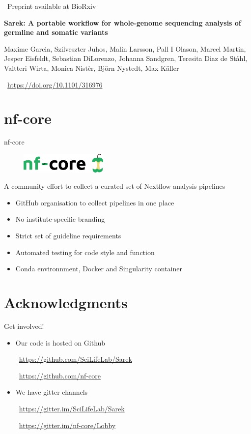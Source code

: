 \documentclass[usepdftitle=false]{beamer}
\begin{document}
\begin{frame}{\faWrench\ Preprint available at BioRxiv}

	\textbf{Sarek: A portable workflow for whole-genome sequencing analysis of germline and somatic variants}

	\small{Maxime Garcia,
	Szilveszter Juhos,
	Malin Larsson,
	Pall I Olason,
	Marcel Martin,
	Jesper Eisfeldt,
	Sebastian DiLorenzo,
	Johanna Sandgren,
	Teresita Diaz de Ståhl,
	Valtteri Wirta,
	Monica Nistèr,
	Björn Nystedt,
	Max Käller}

	\aiDoi\ \url{https://doi.org/10.1101/316976}
\end{frame}

\section{nf-core}

\begin{frame}{nf-core}
	\begin{figure}
		\includegraphics[height=1cm]{pictures/nf-core}
	\end{figure}
	A community effort to collect a curated set of Nextflow analysis pipelines
	\begin{itemize}
		\item GitHub organisation to collect pipelines in one place
		\item No institute-specific branding
		\item Strict set of guideline requirements
		\item Automated testing for code style and function
		\item Conda environnment, Docker and Singularity container
	\end{itemize}
\end{frame}

\section{Acknowledgments}

\begin{frame}{Get involved!}
	\begin{itemize}
		\item Our code is hosted on Github

		\faGithub\ \url{https://github.com/SciLifeLab/Sarek}

		\faGithub\ \url{https://github.com/nf-core}
	\end{itemize}
	\pause
	\begin{itemize}
		\item We have gitter channels

		\faGroup\ \url{https://gitter.im/SciLifeLab/Sarek}

		\faGroup\ \url{https://gitter.im/nf-core/Lobby}
	\end{itemize}
\end{frame}
\end{document}

